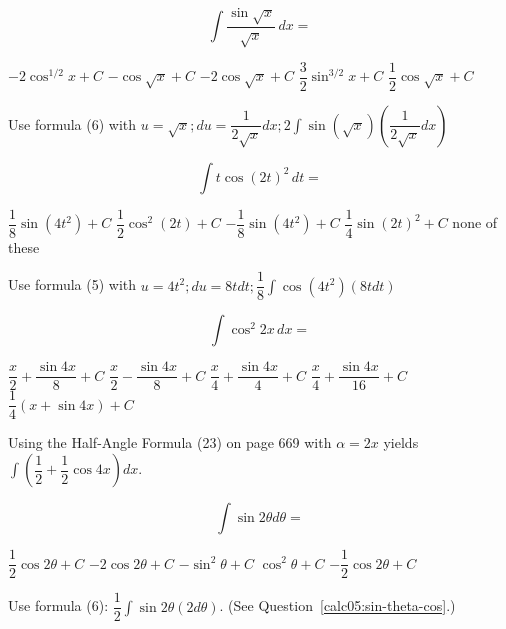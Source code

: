 \question
\[
\displaystyle\int \dfrac{\sin \sqrt{x}}{\sqrt{x}} \,dx=
\]
\begin{choices}
  \choice $-2 \cos ^{1 / 2} x+C$
  \choice $-\cos \sqrt{x}+C$
  \CorrectChoice $-2 \cos \sqrt{x}+C$
  \choice $\dfrac{3}{2} \sin ^{3 / 2} x+C$
  \choice $\dfrac{1}{2} \cos \sqrt{x}+C$
\end{choices}
\begin{solution}
Use formula (6) with $u=\sqrt{x} ; d u=\dfrac{1}{2 \sqrt{x}} d x ; 2 \displaystyle\int \sin (\sqrt{x})\left(\dfrac{1}{2 \sqrt{x}} d x\right)$
\end{solution}




\newpage


\question
\[
\displaystyle\int t \cos (2 t)^{2} \,dt=
\]
\begin{choices}
  \CorrectChoice $\dfrac{1}{8} \sin \left(4 t^{2}\right)+C$
  \choice $\dfrac{1}{2} \cos ^{2}(2 t)+C$
  \choice $-\dfrac{1}{8} \sin \left(4 t^{2}\right)+C$
  \choice $\dfrac{1}{4} \sin (2 t)^{2}+C$
  \choice none of these
\end{choices}
\begin{solution}
Use formula (5) with $u=4 t^{2} ; d u=8 t d t ; \dfrac{1}{8} \displaystyle\int \cos \left(4 t^{2}\right)(8 t d t)$
\end{solution}

\question
\[
\displaystyle\int \cos ^{2} 2 x \,dx=
\]
\begin{choices}
  \CorrectChoice $\dfrac{x}{2}+\dfrac{\sin 4 x}{8}+C$
  \choice $\dfrac{x}{2}-\dfrac{\sin 4 x}{8}+C$
  \choice $\dfrac{x}{4}+\dfrac{\sin 4 x}{4}+C$
  \choice $\dfrac{x}{4}+\dfrac{\sin 4 x}{16}+C$
  \choice $\dfrac{1}{4}(x+\sin 4 x)+C$
\end{choices}
\begin{solution}
Using the Half-Angle Formula (23) on page 669 with $\alpha=2 x$ yields $\displaystyle\int\left(\dfrac{1}{2}+\dfrac{1}{2} \cos 4 x\right) d x$.
\end{solution}

\question
\[
\displaystyle\int \sin 2 \theta d \theta=
\]
\begin{choices}
  \choice $\dfrac{1}{2} \cos 2 \theta+C$
  \choice $-2 \cos 2 \theta+C$
  \choice $-\sin ^{2} \theta+C$
  \choice $\cos ^{2} \theta+C$
  \CorrectChoice $-\dfrac{1}{2} \cos 2 \theta+C$
\end{choices}
\begin{solution}
Use formula (6): $\dfrac{1}{2} \displaystyle\int \sin 2 \theta(2 d \theta)$. (See Question~\ref{calc05:sin-theta-cos}.)
\end{solution}




